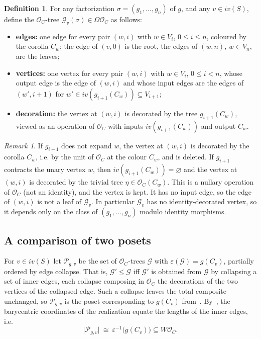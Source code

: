 \documentclass{amsart}
\theoremstyle{definition}
\newtheorem{definition}[formula]{Definition}
\theoremstyle{remark}
\newtheorem{remark}[formula]{Remark}
\newcommand{\eps}{\varepsilon}
\renewcommand{\leq}{\leqslant}
\begin{document}
	\begin{definition}\label{def:Gv}	
		For any factorization $\sigma=(g_1,\dots,g_n)$ of $g$, and any $v\in iv(S)$, define the $\mathcal{O}_C$-tree $\mathcal G_v(\sigma)\in\Omega \mathcal{O}_C$ as follows:
		\begin{itemize}
			\item \textbf{edges:} one edge for every pair $(w,i)$ with $w\in V_i$,
			$0\leqslant i\leqslant n$, coloured by the corolla $C_w$; the edge of
			$(v,0)$ is the root, the edges of $(w,n)$, $w\in V_n$, are the leaves;
			\item \textbf{vertices:} one vertex for every pair $(w,i)$ with $w\in V_i$,
			$0\leqslant i<n$, whose output edge is the edge of $(w,i)$ and whose input
			edges are the edges of $(w',i+1)$ for $w'\in iv(g_{i+1}(C_w))\subseteq
			V_{i+1}$;
			\item \textbf{decoration:} the vertex at $(w,i)$ is decorated by the tree
			$g_{i+1}(C_w)$, viewed as an operation of $\mathcal{O}_C$ with inputs
			$iv(g_{i+1}(C_w))$ and output $C_w$.
		\end{itemize}
	\end{definition}	

	\begin{remark}
		If $g_{i+1}$ does not expand $w$, the vertex at $(w,i)$ is decorated by the
		corolla $C_w$, i.e. by the unit of $\mathcal{O}_C$ at the colour $C_w$, and is
		deleted. 
		If $g_{i+1}$ contracts the unary vertex $w$, then $iv(g_{i+1}(C_w))=\varnothing$ and the vertex at $(w,i)$ is decorated by the trivial tree $\eta\in\mathcal{O}_C(C_w)$. This is a nullary operation of $\mathcal{O}_C$
		(not an identity), and the vertex is kept. 
		It has no input edge, so the edge of
		$(w,i)$ is not a leaf of $\mathcal{G}_v$. In particular $\mathcal{G}_v$ has no
		identity-decorated vertex, so it depends only on the class of
		$(g_1,\dots,g_n)$ modulo identity morphisms.
	\end{remark}
	
	\subsection{A comparison of two posets}\label{ssec:comppos}
	
	For $v\in iv(S)$ let $\mathcal{P}_{g,v}$ be the set of $\mathcal{O}_C$-trees $\mathcal{G}$ with
	$\eps(\mathcal{G})=g(C_v)$, partially ordered by edge collapse.
	That is,
	$\mathcal{G}'\leq\mathcal{G}$ iff $\mathcal{G}'$ is obtained from $\mathcal{G}$ by collapsing a set of inner edges, each collapse composing in $\mathcal{O}_C$ the decorations of the two vertices of the collapsed edge. 
	Such a collapse leaves the total composite
	unchanged, so $\mathcal{P}_{g,v}$ is the poset corresponding to $g(C_{v})$ from~\cite[Rem.~A.10]{clrrw-22}.
	By~\cite[Rem.~A.10]{clrrw-22}, the barycentric coordinates of the realization equate the lengths of the inner edges, i.e.
	\[
		\bigl|\mathcal{P}_{g,v}\bigr|\ \cong\ 	\eps^{-1}\bigl(g(C_v)\bigr)\subseteq W\mathcal{O}_C.
	\]
\end{document}
